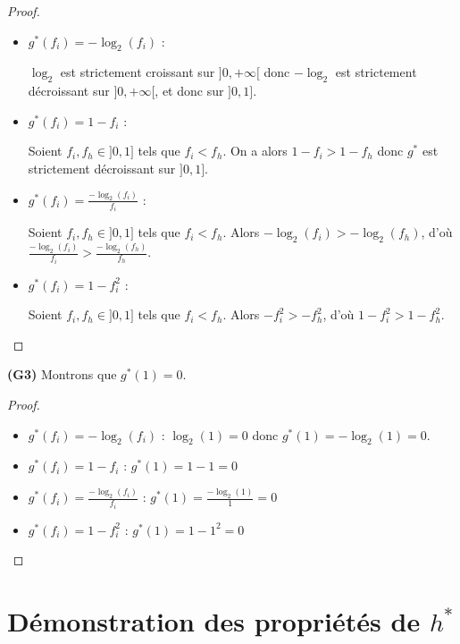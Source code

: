 \documentclass[a4paper]{article}
\begin{document}
\begin{proof}
\begin{itemize}

    \item $g^*(f_i) = -\log_{2}(f_i)$ :

        $\log_{2}$ est strictement croissant sur $]0, +\infty[$ donc $-\log_{2}$
        est strictement décroissant sur $]0,+\infty[$, et donc sur $]0,1]$.

    \item $g^*(f_i) = 1 - f_i$ : 
        
        Soient $f_i, f_h \in ]0,1]$ tels que $f_i < f_h$. On a alors $1 - f_i >
        1 - f_h$ donc $g^*$ est strictement décroissant sur $]0,1]$.

    \item $g^*(f_i) = \frac{-\log_{2}(f_i)}{f_i}$ :

        Soient $f_i, f_h \in ]0,1]$ tels que $f_i < f_h$. Alors $-\log_{2}(f_i) >
        -\log_{2}(f_h)$, d'où $\frac{-\log_{2}(f_i)}{f_i} >
        \frac{-\log_{2}(f_h)}{f_h}$.

    \item $g^*(f_i) = 1-f_i^2$ :

        Soient $f_i, f_h \in ]0,1]$ tels que $f_i < f_h$. Alors $-f_i^2 >
        -f_h^2$, d'où $1 - f_i^2 > 1 - f_h^2$. 

\end{itemize}
\end{proof}

\textbf{(G3)} Montrons que $g^*(1) = 0$.

\begin{proof}
\begin{itemize}

    \item $g^*(f_i) = -\log_{2}(f_i)$ :
        $\log_{2}(1) = 0$ donc $g^*(1) = -\log_{2}(1) = 0$.

    \item $g^*(f_i) = 1 - f_i$ : 
        $g^*(1) = 1 - 1 = 0$

    \item $g^*(f_i) = \frac{-\log_{2}(f_i)}{f_i}$ :
        $g^*(1) = \frac{-\log_{2}(1)}{1} = 0$

    \item $g^*(f_i) = 1-f_i^2$ :
        $g^*(1) = 1 - 1^2 = 0$

\end{itemize}
\end{proof}

\section{Démonstration des propriétés de $h^*$}
\end{document}
